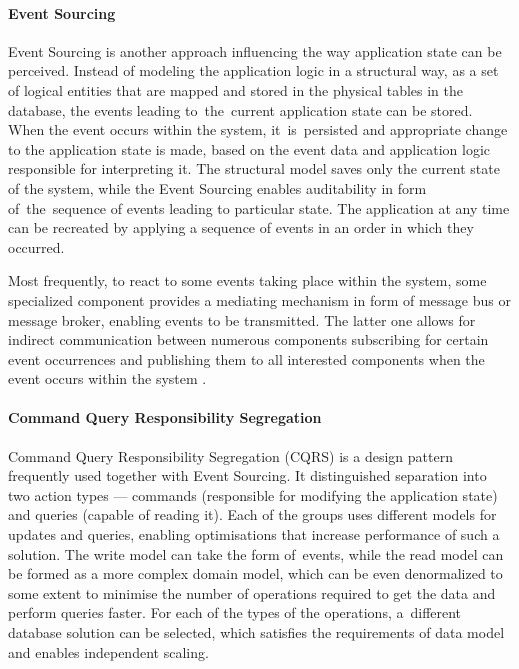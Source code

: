 \paragraph{Event Sourcing} \label{chapter:event-driven-sourcing}

Event Sourcing is another approach influencing the way application state can be perceived. Instead of modeling the application logic in a structural way, as a set of logical entities that are mapped and stored in the physical tables in the database, the events leading to~the~current application state can be stored. When the event occurs within the system, it~is~persisted and appropriate change to the application state is made, based on the event data and application logic responsible for interpreting it. The structural model saves only the current state of the system, while the Event Sourcing enables auditability in form of~the~sequence of events leading to particular state. The application at any time can be recreated by applying a sequence of events in an order in which they occurred.

Most frequently, to react to some events taking place within the system, some specialized component provides a mediating mechanism in form of message bus or message broker, enabling events to be transmitted. The latter one allows for indirect communication between numerous components subscribing for certain event occurrences and publishing them to all interested components when the event occurs within the system \cite{MicroservicesArchitecture}.

\paragraph{Command Query Responsibility Segregation}

Command Query Responsibility Segregation (CQRS) is a design pattern frequently used together with Event Sourcing. It distinguished separation into two action types --- commands (responsible for modifying the application state) and queries (capable of reading it). Each of the groups uses different models for updates and queries, enabling optimisations that increase performance of such a solution. The write model can take the form of~events, while the read model can be formed as a more complex domain model, which can be even denormalized to some extent to minimise the number of operations required to get the data and perform queries faster. For each of the types of the operations, a~different database solution can be selected, which satisfies the requirements of data model and enables independent scaling.

